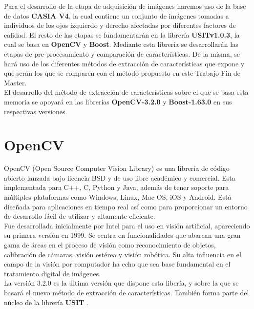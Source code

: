 Para el desarrollo de la etapa de adquisición de imágenes haremos uso de la base de datos \textbf{CASIA V4}, la cual contiene un conjunto de imágenes tomadas a individuos de los ojos izquierdo y derecho afectadas por diferentes factores de calidad. El resto de las etapas se fundamentarán en la librería \textbf{USITv1.0.3}, la cual se basa en \textbf{OpenCV} y \textbf{Boost}. Mediante esta librería se desarrollarán las etapas de pre-procesamiento y comparación de características. De la misma, se hará uso de los diferentes métodos de extracción de características que expone y que serán los que se comparen con el método propuesto en este Trabajo Fin de Master. \\

El desarrollo del método de extracción de características sobre el que se basa esta memoria se apoyará en las librerías \textbf{OpenCV-3.2.0} y \textbf{Boost-1.63.0} en sus respectivas versiones. \\




\section{OpenCV}

OpenCV (Open Source Computer Vision Library) es una librería de código abierto lanzada bajo licencia BSD y de uso libre académico y comercial. Esta implementada para C++, C, Python y Java, además de tener soporte para múltiples plataformas como Windows, Linux, Mac OS, iOS y Android. Está diseñada para aplicaciones en tiempo real así como para proporcionar un entorno de desarrollo fácil de utilizar y altamente eficiente. \\

Fue desarrollada inicialmente por Intel para el uso en visión artificial, apareciendo su primera versión en 1999. Se centra en funcionalidades que abarcan una gran gama de áreas en el proceso de visión como reconocimiento de objetos, calibración de cámaras, visión estérea y visión robótica. Su alta influencia en el campo de la visión por computador ha echo que sea base fundamental en el tratamiento digital de imágenes. \\

La versión 3.2.0 es la última versión que dispone esta libería, y sobre la que se basará el nuevo método de extracción de características. También forma parte del núcleo de la librería \textbf{USIT} \cite{Reference16}.

